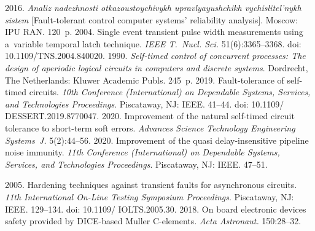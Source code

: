   \begin{multicols}{2}

\renewcommand{\bibname}{\protect\rmfamily References}

{\small\frenchspacing
 {%
 \begin{thebibliography}{9}
 2016. \textit{Analiz 
nadezhnosti otkazoustoychivykh upravlyayushchikh vychislitel'nykh sistem}  
[Fault-tolerant control computer systems' reliability analysis]. Moscow: IPU RAN. 
120~p.
 2004. Single event transient pulse width measurements using 
a~variable temporal latch technique. \textit{IEEE T.~Nucl. Sci.} 51(6):3365--3368. 
doi: 10.1109/TNS.2004.840020.
 1990.  
\textit{Self-timed control of concurrent processes:
The design of aperiodic logical circuits in computers and discrete  
systems}. Dordrecht, The Netherlands: 
Kluwer Academic Publs. 245~p.
 2019. Fault-tolerance of self-timed 
circuits. \textit{10th Conference (International) on Dependable Systems, Services, 
and Technologies Proceedings}. Piscataway, NJ: IEEE. 41--44. doi: 
10.1109/ DESSERT.2019.8770047.
 2020. Improvement of the natural 
self-timed circuit tolerance to short-term soft errors. \textit{Advances Science 
Technology Engineering Systems~J.} 5(2):44--56.
 2020. Improvement of the quasi delay-insensitive pipeline noise 
immunity. \textit{11th Conference (International) on Dependable Systems, Services, 
and Technologies Proceedings}. Piscataway, NJ: IEEE. 47--51.

 2005. Hardening techniques 
against transient faults for asynchronous circuits. \textit{11th International On-Line Testing Symposium 
Proceedings}. Piscataway, NJ: IEEE. 129--134. doi: 10.1109/ IOLTS.2005.30.
 2018. On board electronic devices safety 
provided by DICE-based Muller C-elements. \textit{Acta Astronaut.} 150:28--32.

\end{thebibliography}

 }
 }

\end{multicols}

